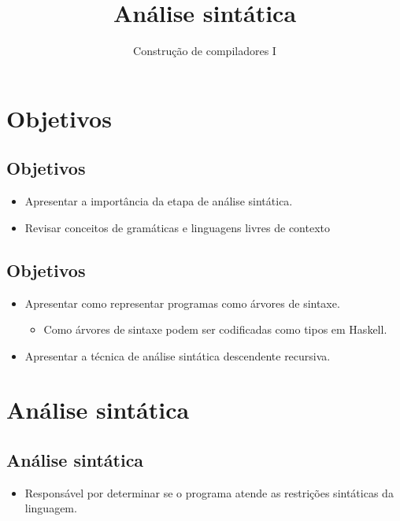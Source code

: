 \documentclass[11pt]{article}
\author{Construção de compiladores I}
\date{}
\title{Análise sintática}
\begin{document}
\maketitle
\section*{Objetivos}
\label{sec:orgd6645e3}

\subsection*{Objetivos}
\label{sec:orge93a2d9}

\begin{itemize}
\item Apresentar a importância da etapa de análise sintática.

\item Revisar conceitos de gramáticas e linguagens livres de contexto
\end{itemize}
\subsection*{Objetivos}
\label{sec:orgcfe0114}

\begin{itemize}
\item Apresentar como representar programas como árvores de sintaxe.
\begin{itemize}
\item Como árvores de sintaxe podem ser codificadas como tipos em Haskell.
\end{itemize}

\item Apresentar a técnica de análise sintática descendente recursiva.
\end{itemize}
\section*{Análise sintática}
\label{sec:org4659ab1}

\subsection*{Análise sintática}
\label{sec:orge4886c1}

\begin{itemize}
\item Responsável por determinar se o programa atende as restrições sintáticas
da linguagem.
\end{itemize}
\end{document}
